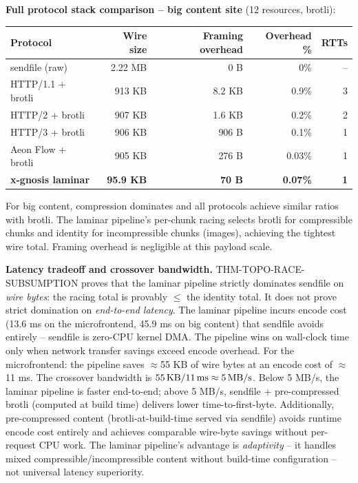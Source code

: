 \documentclass[
  11pt,
]{article}
\newcounter{none} %
\begin{document}
\textbf{Full protocol stack comparison -- big content site} (12
resources, brotli):

{\def\LTcaptype{none} %
\begin{longtable}[]{@{}lrrrr@{}}
\toprule\noalign{}
Protocol & Wire size & Framing overhead & Overhead \% & RTTs \\
\midrule\noalign{}
\endhead
\bottomrule\noalign{}
\endlastfoot
sendfile (raw) & 2.22 MB & 0 B & 0\% & -- \\
HTTP/1.1 + brotli & 913 KB & 8.2 KB & 0.9\% & 3 \\
HTTP/2 + brotli & 907 KB & 1.6 KB & 0.2\% & 2 \\
HTTP/3 + brotli & 906 KB & 906 B & 0.1\% & 1 \\
Aeon Flow + brotli & 905 KB & 276 B & 0.03\% & 1 \\
\textbf{x-gnosis laminar} & \textbf{95.9 KB} & \textbf{70 B} &
\textbf{0.07\%} & \textbf{1} \\
\end{longtable}
}

For big content, compression dominates and all protocols achieve similar
ratios with brotli. The laminar pipeline's per-chunk racing selects
brotli for compressible chunks and identity for incompressible chunks
(images), achieving the tightest wire total. Framing overhead is
negligible at this payload scale.

\textbf{Latency tradeoff and crossover bandwidth.}
THM-TOPO-RACE-SUBSUMPTION proves that the laminar pipeline strictly
dominates sendfile on \emph{wire bytes}: the racing total is provably
\(\leq\) the identity total. It does not prove strict domination on
\emph{end-to-end latency}. The laminar pipeline incurs encode cost (13.6
ms on the microfrontend, 45.9 ms on big content) that sendfile avoids
entirely -- sendfile is zero-CPU kernel DMA. The pipeline wins on
wall-clock time only when network transfer savings exceed encode
overhead. For the microfrontend: the pipeline saves \(\approx\)55 KB of
wire bytes at an encode cost of \(\approx\)11 ms. The crossover
bandwidth is \(55\text{\,KB}/11\text{\,ms} \approx 5\text{\,MB/s}\).
Below 5 MB/s, the laminar pipeline is faster end-to-end; above 5 MB/s,
sendfile + pre-compressed brotli (computed at build time) delivers lower
time-to-first-byte. Additionally, pre-compressed content
(brotli-at-build-time served via sendfile) avoids runtime encode cost
entirely and achieves comparable wire-byte savings without per-request
CPU work. The laminar pipeline's advantage is \emph{adaptivity} -- it
handles mixed compressible/incompressible content without build-time
configuration -- not universal latency superiority.
\end{document}
